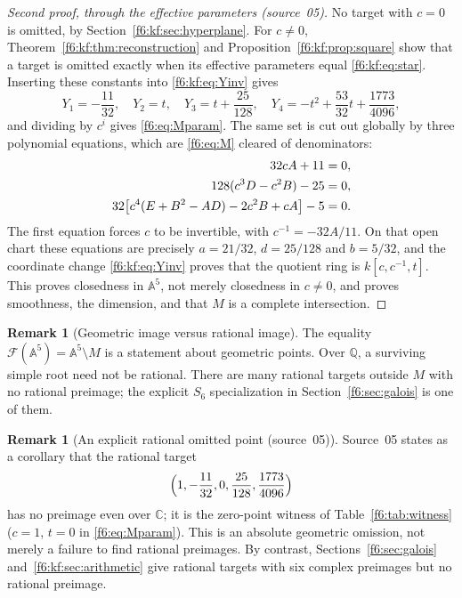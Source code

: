 \documentclass[11pt,a4paper]{article}
\theoremstyle{definition}
\newtheorem{remark}[theorem]{Remark}
\newcommand{\A}{\mathbb A}
\newcommand{\C}{\mathbb C}
\newcommand{\Q}{\mathbb Q}
\newcommand{\F}{\mathcal F}
\newcommand{\src}[1]{\textup{(source~#1)}}
\begin{document}
\begin{proof}[Second proof, through the effective parameters \src{05}]
No target with $c=0$ is omitted, by Section~\ref{f6:kf:sec:hyperplane}. For
$c\ne0$, Theorem~\ref{f6:kf:thm:reconstruction} and
Proposition~\ref{f6:kf:prop:square} show that a target is omitted exactly
when its effective parameters equal \eqref{f6:kf:eq:star}. Inserting these
constants into \eqref{f6:kf:eq:Yinv} gives
\[
Y_1=-\frac{11}{32},\quad Y_2=t,\quad Y_3=t+\frac{25}{128},\quad
Y_4=-t^2+\frac{53}{32}t+\frac{1773}{4096},
\]
and dividing by $c^i$ gives \eqref{f6:eq:Mparam}. The same set is cut out
globally by three polynomial equations, which are \eqref{f6:eq:M} cleared of
denominators:
\begin{align}
32cA+11&=0,\notag\\
128(c^3D-c^2B)-25&=0,\label{f6:kf:eq:Mideal}\\
32\bigl[c^4(E+B^2-AD)-2c^2B+cA\bigr]-5&=0.\notag
\end{align}
The first equation forces $c$ to be invertible, with $c^{-1}=-32A/11$. On
that open chart these equations are precisely $a=21/32$, $d=25/128$ and
$b=5/32$, and the coordinate change \eqref{f6:kf:eq:Yinv} proves that the
quotient ring is $k[c,c^{-1},t]$. This proves closedness in $\A^5$, not merely
closedness in $c\ne0$, and proves smoothness, the dimension, and that $M$ is
a complete intersection.
\end{proof}

\begin{remark}[Geometric image versus rational image]
The equality $\F(\A^5)=\A^5\setminus M$ is a statement about geometric
points. Over $\Q$, a surviving simple root need not be rational. There are
many rational targets outside $M$ with no rational preimage; the explicit
$S_6$ specialization in Section~\ref{f6:sec:galois} is one of them.
\end{remark}

\begin{remark}[An explicit rational omitted point \src{05}]
\label{f6:kf:cor:rationalmissing}
Source~05 states as a corollary that the rational target
\begin{equation}\label{f6:kf:eq:rationalmissing}
\Bigl(1,-\frac{11}{32},0,\frac{25}{128},\frac{1773}{4096}\Bigr)
\end{equation}
has no preimage even over $\C$; it is the zero-point witness of
Table~\ref{f6:tab:witness} ($c=1$, $t=0$ in \eqref{f6:eq:Mparam}). This is
an absolute geometric omission, not merely a failure to find rational
preimages. By contrast, Sections~\ref{f6:sec:galois}
and~\ref{f6:kf:sec:arithmetic} give rational targets with six complex
preimages but no rational preimage.
\end{remark}
\end{document}
